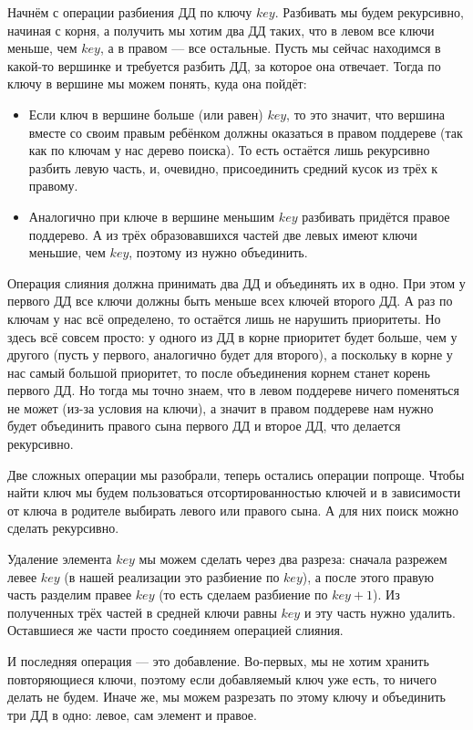 Начнём с операции разбиения ДД по ключу $key$. Разбивать мы будем рекурсивно, начиная с корня, а получить мы хотим два ДД таких, что в левом все ключи меньше, чем $key$, а в правом — все остальные. Пусть мы сейчас находимся в какой-то вершинке и требуется разбить ДД, за которое она отвечает. Тогда по ключу в вершине мы можем понять, куда она пойдёт: 

\begin{itemize}
    \item Если ключ в вершине больше (или равен) $key$, то это значит, что вершина вместе со своим правым ребёнком должны оказаться в правом поддереве (так как по ключам у нас дерево поиска). То есть остаётся лишь рекурсивно разбить левую часть, и, очевидно, присоединить средний кусок из трёх к правому.
    \item Аналогично при ключе в вершине меньшим $key$ разбивать придётся правое поддерево. А из трёх образовавшихся частей две левых имеют ключи меньшие, чем $key$, поэтому из нужно объединить.
\end{itemize}

Операция слияния должна принимать два ДД и объединять их в одно. При этом у первого ДД все ключи должны быть меньше всех ключей второго ДД. А раз по ключам у нас всё определено, то остаётся лишь не нарушить приоритеты. Но здесь всё совсем просто: у одного из ДД в корне приоритет будет больше, чем у другого (пусть у первого, аналогично будет для второго), а поскольку в корне у нас самый большой приоритет, то после объединения корнем станет корень первого ДД. Но тогда мы точно знаем, что в левом поддереве ничего поменяться не может (из-за условия на ключи), а значит в правом поддереве нам нужно будет объединить правого сына первого ДД и второе ДД, что делается рекурсивно.

Две сложных операции мы разобрали, теперь остались операции попроще. Чтобы найти ключ мы будем пользоваться отсортированностью ключей и в зависимости от ключа в родителе выбирать левого или правого сына. А для них поиск можно сделать рекурсивно.

Удаление элемента $key$ мы можем сделать через два разреза: сначала разрежем левее $key$ (в нашей реализации это разбиение по $key$), а после этого правую часть разделим правее $key$ (то есть сделаем разбиение по $key + 1$). Из полученных трёх частей в средней ключи равны $key$ и эту часть нужно удалить. Оставшиеся же части просто соединяем операцией слияния.

И последняя операция — это добавление. Во-первых, мы не хотим хранить повторяющиеся ключи, поэтому если добавляемый ключ уже есть, то ничего делать не будем. Иначе же, мы можем разрезать по этому ключу и объединить три ДД в одно: левое, сам элемент и правое.

